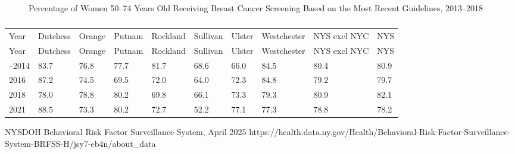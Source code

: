 \documentclass[
  english,
  letterpaper,
]{report}
\begin{document}
\begin{figure}


\caption{\label{fig-female-breastca-screening-percent}Percentage of
Women 50--74 Years Old Receiving Breast Cancer Screening Based on the
Most Recent Guidelines, 2013--2018}

\end{figure}%

\begin{longtable}[]{@{}llllllllll@{}}

\caption{\label{tbl-female-breastca-screening-percent}Percentage of
Women 50--74 Years Old Receiving Breast Cancer Screening Based on the
Most Recent Guidelines, 2013--2018}

\tabularnewline

\caption{}\label{T_a14e9}\tabularnewline
\toprule\noalign{}
Year & Dutchess & Orange & Putnam & Rockland & Sullivan & Ulster &
Westchester & NYS excl NYC & NYS \\
\midrule\noalign{}
\endfirsthead
\toprule\noalign{}
Year & Dutchess & Orange & Putnam & Rockland & Sullivan & Ulster &
Westchester & NYS excl NYC & NYS \\
\midrule\noalign{}
\endhead
\bottomrule\noalign{}
\endlastfoot
2013--2014 & 83.7 & 76.8 & 77.7 & 81.7 & 68.6 & 66.0 & 84.5 & 80.4 &
80.9 \\
2016 & 87.2 & 74.5 & 69.5 & 72.0 & 64.0 & 72.3 & 84.8 & 79.2 & 79.7 \\
2018 & 78.0 & 78.8 & 80.2 & 69.8 & 66.1 & 73.3 & 79.3 & 80.9 & 82.1 \\
2021 & 88.5 & 73.3 & 80.2 & 72.7 & 52.2 & 77.1 & 77.3 & 78.8 & 78.2 \\

\end{longtable}

\begin{tcolorbox}[enhanced jigsaw, breakable, leftrule=.75mm, title=\textcolor{quarto-callout-note-color}{\faInfo}\hspace{0.5em}{Source}, bottomrule=.15mm, opacityback=0, left=2mm, colback=white, bottomtitle=1mm, coltitle=black, colbacktitle=quarto-callout-note-color!10!white, colframe=quarto-callout-note-color-frame, opacitybacktitle=0.6, toptitle=1mm, titlerule=0mm, arc=.35mm, rightrule=.15mm, toprule=.15mm]

NYSDOH Behavioral Risk Factor Surveillance System, April 2025
https://health.data.ny.gov/Health/Behavioral-Risk-Factor-Surveillance-System-BRFSS-H/jsy7-eb4n/about\_data

\end{tcolorbox}
\end{document}
